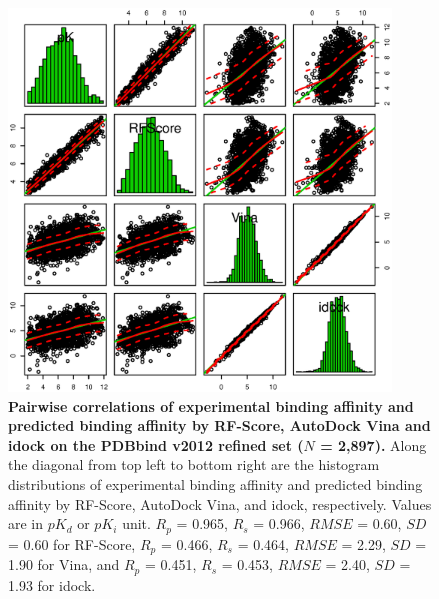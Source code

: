 \documentclass[10pt]{article}
\begin{document}
\begin{figure}[!ht]
\begin{center}
\includegraphics[width=4in]{PDBbind2012Correlations.eps}
\end{center}
\caption{
{\bf Pairwise correlations of experimental binding affinity and predicted binding affinity by RF-Score, AutoDock Vina and idock on the PDBbind v2012 refined set ($N$ = 2,897).} Along the diagonal from top left to bottom right are the histogram distributions of experimental binding affinity and predicted binding affinity by RF-Score, AutoDock Vina, and idock, respectively. Values are in $pK_d$ or $pK_i$ unit. $R_p$ = 0.965, $R_s$ = 0.966, $RMSE$ = 0.60, $SD$ = 0.60 for RF-Score, $R_p$ = 0.466, $R_s$ = 0.464, $RMSE$ = 2.29, $SD$ = 1.90 for Vina, and $R_p$ = 0.451, $R_s$ = 0.453, $RMSE$ = 2.40, $SD$ = 1.93 for idock.
}
\label{PDBbind2012Correlations}
\end{figure}
\end{document}
